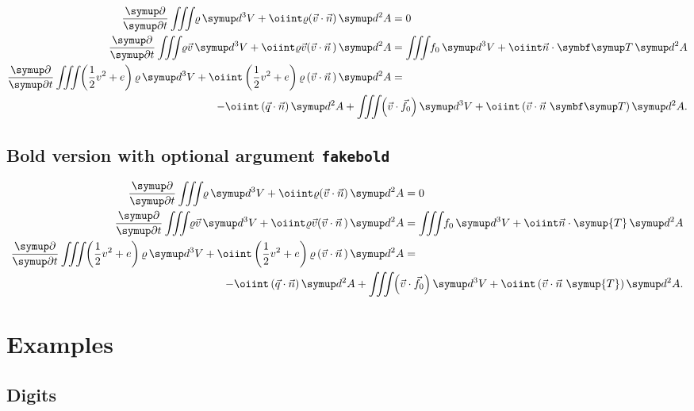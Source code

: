 \documentclass[english,log-declarations=false]{article}
\begin{document}
\begin{align}
 \Q{}{t}\iiint\<\varrho\diff^3V+\oiint\varrho(\vec{v}\cdot\vec{n})\diff^2A          &= 0\\
 \Q{}{t}\iiint\<\varrho\vec{v}\diff^3V+\oiint\varrho\vec{v}(\vec{v}\cdot\vec{n}\,)\diff^2A &=
        \iiint\<f_0\diff^3V+\oiint\vec{n}\cdot\TT\diff^2A \\
 \Q{}{t}\iiint\<\left(\half v^2+e\right)\varrho\diff^3V+\oiint\left(\half v^2+e\right)
        \varrho\left(\vec{v}\cdot\vec{n}\,\right)\diff^2A                                & =\\
 \multispan2{\hfill${\displaystyle-\oiint\left(\vec{q}\cdot\vec{n}\right)\diff^2A+
         \iiint\<\left(\vec{v}\cdot\vec{f}_0\right)\diff^3V+\oiint\left(\vec{v}
         \cdot\vec{n}~\TT\right)\diff^2A}$}.\nonumber
\end{align}

\subsection{Bold version with optional argument \texttt{fakebold}}


\setBold
\begin{align}
 \Q{}{t}\iiint\<\varrho\diff^3V+\oiint\varrho(\vec{v}\cdot\vec{n})\diff^2A          &= 0\\
 \Q{}{t}\iiint\<\varrho\vec{v}\diff^3V+\oiint\varrho\vec{v}(\vec{v}\cdot\vec{n}\,)\diff^2A &=
        \iiint\<f_0\diff^3V+\oiint\vec{n}\cdot\symup{T}\diff^2A \\
 \Q{}{t}\iiint\<\left(\half v^2+e\right)\varrho\diff^3V+\oiint\left(\half v^2+e\right)
        \varrho\left(\vec{v}\cdot\vec{n}\,\right)\diff^2A                                & =\\
 \multispan2{\hfill${\displaystyle-\oiint\left(\vec{q}\cdot\vec{n}\right)\diff^2A+
         \iiint\<\left(\vec{v}\cdot\vec{f}_0\right)\diff^3V+\oiint\left(\vec{v}
         \cdot\vec{n}~\symup{T}\right)\diff^2A}$}.\nonumber
\end{align}
\unsetBold


\fi


\section{Examples}

\subsection{Digits}
\end{document}
